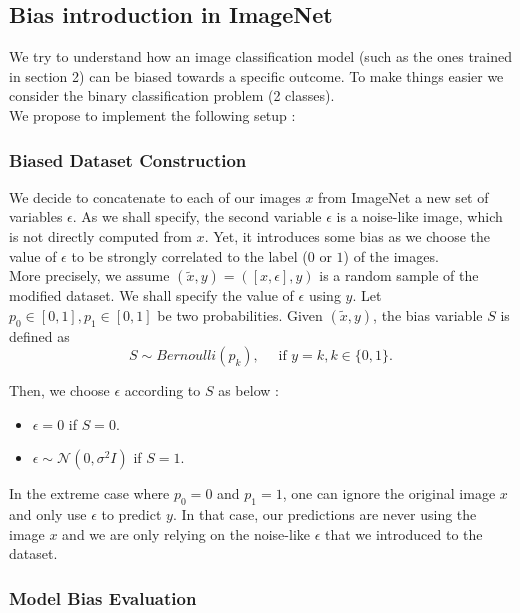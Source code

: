 \documentclass[12pt,a4paper]{article}
\begin{document}
\subsection{Bias introduction in ImageNet}

We try to understand how an image classification model (such as the ones trained in section 2) can be biased towards a specific outcome.
To make things easier we consider the binary classification problem (2 classes). \\
We propose to implement the following setup :


\subsubsection{Biased Dataset Construction}

We decide to concatenate to each of our images $x$ from ImageNet a new set of variables $\epsilon$.
As we shall specify, the second variable $\epsilon$ is a noise-like image, which is not directly computed from $x$.
Yet, it introduces some bias as we choose the value of $\epsilon$ to be strongly correlated to the label ($0$ or $1$) of the images.\\

More precisely, we assume $(\tilde{x}, y) = ([x, \epsilon], y)$ is a random sample of the modified dataset.  
We shall specify the value of $\epsilon$ using $y$. Let $p_0 \in [0, 1], p_1 \in [0, 1]$ be two probabilities.  
Given $(\tilde{x}, y)$, the bias variable $S$ is defined as
$$
S \sim Bernoulli(p_k), \quad \text{ if } y = k, k \in \{0, 1\}.
$$

Then, we choose $\epsilon$ according to $S$ as below :
\begin{itemize}[label=--]
    \item $\epsilon = 0$ if $S = 0$.
    \item $\epsilon \sim \mathcal{N}(0, \sigma^2I)$ if $S = 1$.
\end{itemize}

In the extreme case where $p_0 = 0$ and $p_1 = 1$, one can ignore the original image $x$ and only use $\epsilon$ to predict $y$.
In that case, our predictions are never using the image $x$ and we are only relying on the noise-like $\epsilon$ that we introduced to the dataset.


\subsubsection{Model Bias Evaluation}
\end{document}
